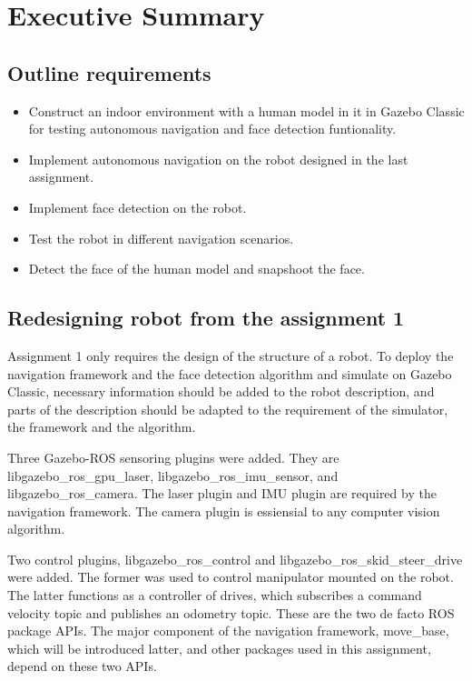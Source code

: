 \section{Executive Summary}
\setlength{\parskip}{0pt plus 4pt}

\subsection{Outline requirements}

\begin{itemize}
   \item Construct an indoor environment with a human model in it in Gazebo Classic for testing autonomous navigation and face detection funtionality.
   \item Implement autonomous navigation on the robot designed in the last assignment.
   \item Implement face detection on the robot.
   \item Test the robot in different navigation scenarios.
   \item Detect the face of the human model and snapshoot the face.
\end{itemize}


\subsection{Redesigning robot from the assignment 1}

Assignment 1 only requires the design of the structure of a robot. To deploy the navigation framework and the face detection algorithm and simulate on Gazebo Classic, necessary information should be added to the robot description, and parts of the description should be adapted to the requirement of the simulator, the framework and the algorithm.

Three Gazebo-ROS sensoring plugins were added. They are libgazebo\_ros\_gpu\_laser, libgazebo\_ros\_imu\_sensor, and libgazebo\_ros\_camera. The laser plugin and IMU plugin are required by the navigation framework. The camera plugin is essiensial to any computer vision algorithm.

Two control plugins, libgazebo\_ros\_control and libgazebo\_ros\_skid\_steer\_drive were added. The former was used to control manipulator mounted on the robot. The latter functions as a controller of drives, which subscribes a command velocity topic and publishes an odometry topic. These are the two de facto ROS package APIs. The major component of the navigation framework, move\_base, which will be introduced latter, and other packages used in this assignment, depend on these two APIs.


